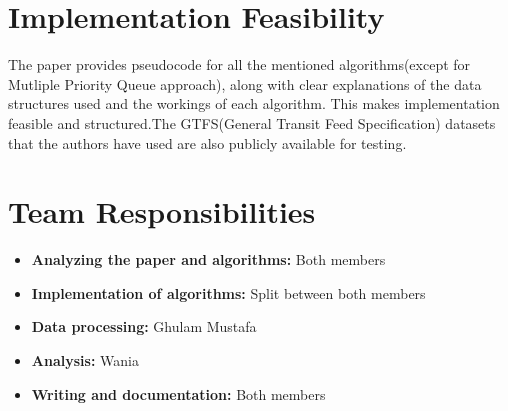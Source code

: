 \documentclass{article}
\begin{document}
\section{Implementation Feasibility}
The paper provides pseudocode for all the mentioned algorithms(except for Mutliple Priority Queue approach), along with clear explanations of the data structures used and the workings of each algorithm. This makes implementation feasible and structured.The GTFS(General Transit Feed Specification) datasets that the authors have used are also publicly available for testing.

\section{Team Responsibilities}
\begin{itemize}
\item \textbf{Analyzing the paper and algorithms:} Both members
\item \textbf{Implementation of algorithms:} Split between both members
\item \textbf{Data processing:} Ghulam Mustafa
\item \textbf{Analysis:} Wania
\item \textbf{Writing and documentation:} Both members
\end{itemize}
\end{document}

